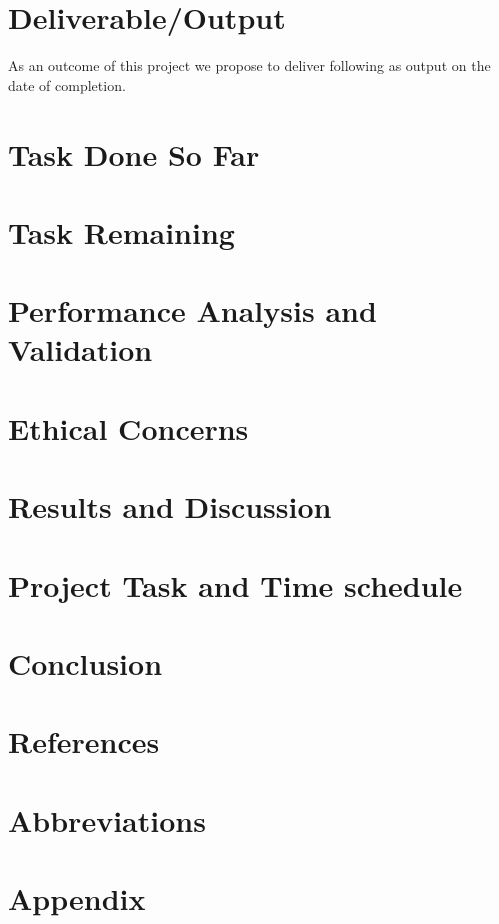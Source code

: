 \documentclass[a4paper,12pt]{article}
\begin{document}
\section{Deliverable/Output}
As an outcome of this project we propose to deliver following as output on the date of completion.

\newpage

\section{Task Done So Far}

\newpage

\section{Task Remaining}

\newpage

\section{Performance Analysis and Validation}

\newpage

\section{Ethical Concerns}

\newpage

\section{Results and Discussion}

\newpage

\section{Project Task and Time schedule}

\newpage

\section{Conclusion}

\newpage

\section*{References}
\raggedright

\printbibliography[heading=none]
\newpage
\section{Abbreviations}

\newpage

\section{Appendix}
\newpage
\end{document}
